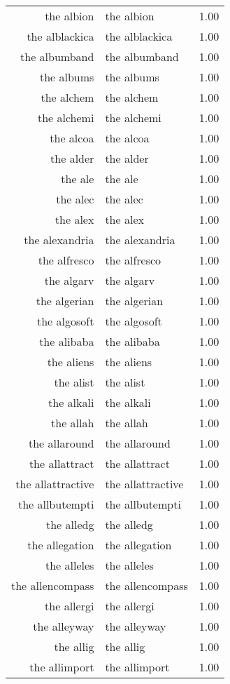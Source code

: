 \begin{table}[ht]
\begin{tabular}{rlr}
  the albion & the albion & 1.00 \\ 
  the alblackica & the alblackica & 1.00 \\ 
  the albumband & the albumband & 1.00 \\ 
  the albums & the albums & 1.00 \\ 
  the alchem & the alchem & 1.00 \\ 
  the alchemi & the alchemi & 1.00 \\ 
  the alcoa & the alcoa & 1.00 \\ 
  the alder & the alder & 1.00 \\ 
  the ale & the ale & 1.00 \\ 
  the alec & the alec & 1.00 \\ 
  the alex & the alex & 1.00 \\ 
  the alexandria & the alexandria & 1.00 \\ 
  the alfresco & the alfresco & 1.00 \\ 
  the algarv & the algarv & 1.00 \\ 
  the algerian & the algerian & 1.00 \\ 
  the algosoft & the algosoft & 1.00 \\ 
  the alibaba & the alibaba & 1.00 \\ 
  the aliens & the aliens & 1.00 \\ 
  the alist & the alist & 1.00 \\ 
  the alkali & the alkali & 1.00 \\ 
  the allah & the allah & 1.00 \\ 
  the allaround & the allaround & 1.00 \\ 
  the allattract & the allattract & 1.00 \\ 
  the allattractive & the allattractive & 1.00 \\ 
  the allbutempti & the allbutempti & 1.00 \\ 
  the alledg & the alledg & 1.00 \\ 
  the allegation & the allegation & 1.00 \\ 
  the alleles & the alleles & 1.00 \\ 
  the allencompass & the allencompass & 1.00 \\ 
  the allergi & the allergi & 1.00 \\ 
  the alleyway & the alleyway & 1.00 \\ 
  the allig & the allig & 1.00 \\ 
  the allimport & the allimport & 1.00 \\ 

\end{tabular}
\end{table}
